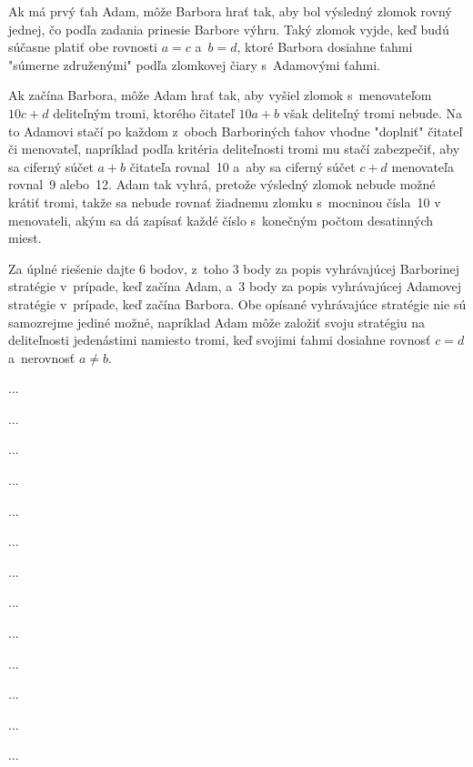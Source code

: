 {%
Ak má prvý ťah Adam, môže Barbora hrať tak, aby bol výsledný
zlomok rovný jednej, čo podľa zadania prinesie Barbore výhru.
Taký zlomok vyjde, keď budú súčasne platiť obe rovnosti $a=c$
a~$b=d$, ktoré Barbora dosiahne ťahmi "súmerne združenými"
podľa zlomkovej čiary s~Adamovými ťahmi.

Ak začína Barbora, môže Adam hrať tak, aby vyšiel zlomok
s~menovateľom $10c+d$ deliteľným tromi, ktorého čitateľ $10a+b$
však deliteľný tromi nebude. Na to Adamovi stačí
po každom z~oboch Barboriných ťahov vhodne "doplniť" čitateľ či
menovateľ, napríklad podľa kritéria deliteľnosti tromi mu stačí
zabezpečiť, aby sa ciferný súčet $a+b$ čitateľa rovnal~10 a~aby
sa ciferný súčet $c+d$ menovateľa rovnal~9 alebo~12.
Adam tak vyhrá, pretože výsledný zlomok nebude
možné krátiť tromi, takže sa nebude rovnať žiadnemu zlomku
s~mocninou čísla~10 v menovateli, akým sa dá zapísať každé
číslo s~konečným počtom desatinných miest.

\nobreak\medskip\petit\noindent
Za úplné riešenie dajte 6 bodov, z~toho 3 body za popis vyhrávajúcej
Barborinej stratégie v~prípade, keď začína Adam, a~3 body za popis vyhrávajúcej
Adamovej stratégie v~prípade, keď začína Barbora. Obe opísané
vyhrávajúce stratégie nie sú samozrejme jediné možné, napríklad Adam
môže založiť svoju stratégiu na deliteľnosti jedenástimi namiesto
tromi, keď svojimi ťahmi dosiahne rovnosť $c=d$ a~nerovnosť $a\ne b$.

\endpetit
}

{%
...}

{%
...}

{%
...}

{%
...}

{%
...}

{%
...}

{%
...}

{%
...}

{%
...}

{%
...}

{%
...}

{%
...}

{%
...}

